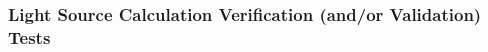 \documentclass[12pt, titlepage]{article}
\begin{document}











	

\subsubsection{Light Source Calculation Verification (and/or Validation) Tests}
\end{document}
